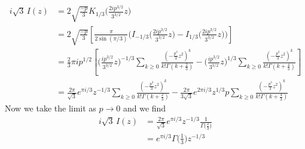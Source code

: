 \documentclass{article}
\theoremstyle{definition}
\theoremstyle{plain}
\newenvironment{verify}{\color{ForestGreen}}{\color{black}}
\newenvironment{old}{\color{RoyalBlue}}{\color{black}}
\begin{document}
\begin{verify}
\begin{align*}
\end{align*}
\begin{old}\begin{align*}
i\sqrt{3}\,I(z) & = 2\sqrt{\frac{-p}{3}} K_{1/3}\Big(\frac{2ip^{3/2}}{3^{3/2}}z\Big) \\
&=2\sqrt{\frac{-p}{3}}\left[\frac{\pi}{2\sin(\pi/3)}\Big(I_{-1/3}\big(\tfrac{2ip^{3/2}}{3^{3/2}}z\big)-I_{1/3}\big(\tfrac{2ip^{3/2}}{3^{3/2}}z\big)\Big)\right]\\
&=\frac{2}{3}\pi ip^{1/2}\left[\Big(\frac{ip^{3/2}}{3^{3/2}}z\Big)^{-1/3}\sum_{k\geq 0}\frac{(-\tfrac{p^3}{3}z^2)^k}{k!\Gamma(k+\tfrac{2}{3})}-\Big(\frac{ip^{3/2}}{3^{3/2}}z\Big)^{1/3}\sum_{k\geq 0}\frac{(-\tfrac{p^3}{3}z^2)^k}{k!\Gamma(k+\tfrac{4}{3})}\right]\\
&=\frac{2\pi}{\sqrt{3}} e^{\pi i/3} z^{-1/3} \sum_{k\geq 0}\frac{(-\tfrac{p^3}{3}z^2)^k}{k!\Gamma(k+\tfrac{2}{3})}-\frac{2\pi }{3\sqrt{3}} e^{2\pi i/3} z^{1/3} p \sum_{k\geq 0}\frac{(-\tfrac{p^3}{3}z^2)^k}{k!\Gamma(k+\tfrac{4}{3})}
\end{align*}
Now we take the limit as $p\to 0$ and we find 
\begin{align*}
i\sqrt{3}\,I(z) & = \frac{2\pi}{\sqrt{3}} e^{\pi i/3} z^{-1/3} \frac{1}{\Gamma\big(\tfrac{2}{3}\big)} \\
& = e^{\pi i/3} \Gamma\big(\tfrac{1}{3}\big) z^{-1/3}
\end{align*}\end{old}
\end{verify}
%
\end{document}
